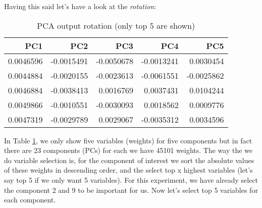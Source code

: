 \documentclass[
]{book}
\newenvironment{Shaded}{\begin{snugshade}}{\end{snugshade}}
\newcommand{\CommentTok}[1]{\textcolor[rgb]{0.56,0.35,0.01}{\textit{#1}}}
\newcommand{\DataTypeTok}[1]{\textcolor[rgb]{0.13,0.29,0.53}{#1}}
\newcommand{\DecValTok}[1]{\textcolor[rgb]{0.00,0.00,0.81}{#1}}
\newcommand{\KeywordTok}[1]{\textcolor[rgb]{0.13,0.29,0.53}{\textbf{#1}}}
\newcommand{\NormalTok}[1]{#1}
\newcommand{\OperatorTok}[1]{\textcolor[rgb]{0.81,0.36,0.00}{\textbf{#1}}}
\newcommand{\StringTok}[1]{\textcolor[rgb]{0.31,0.60,0.02}{#1}}
\theoremstyle{definition}
\theoremstyle{definition}
\theoremstyle{definition}
\theoremstyle{remark}
\begin{document}
Having this said let's have a look at the \emph{rotation}:

\begin{Shaded}
\end{Shaded}

\begin{table}

\caption{\label{tab:tabpca3}PCA output rotation (only top 5 are shown)}
\centering
\begin{tabular}[t]{r|r|r|r|r}
\hline
PC1 & PC2 & PC3 & PC4 & PC5\\
\hline
0.0046596 & -0.0015491 & -0.0050678 & -0.0013241 & 0.0030454\\
\hline
0.0044884 & -0.0020155 & -0.0023613 & -0.0061551 & -0.0025862\\
\hline
0.0046884 & -0.0038413 & 0.0016769 & 0.0037431 & 0.0104244\\
\hline
0.0049866 & -0.0010551 & -0.0030093 & 0.0018562 & 0.0009776\\
\hline
0.0047319 & -0.0029789 & 0.0029067 & -0.0035312 & 0.0034596\\
\hline
\end{tabular}
\end{table}

In Table \ref{tab:tabpca3}, we only show five variables (weights) for five components but in fact there are 23 components (PCs) for each we have 45101 weights.
The way the we do variable selection is, for the component of interest we sort the absolute values of these weights in descending order, and the select top x highest variables (let's say top 5 if we only want 5 variables). For this experiment, we have already select the component 2 and 9 to be important for us. Now let's select top 5 variables for each component.
\end{document}
